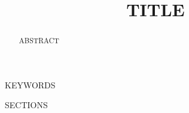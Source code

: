 \documentclass[conference]{IEEEtran}
\begin{document}
\title{{{TITLE}}}

\author{
}

\maketitle

\begin{abstract}
{{ABSTRACT}}
\end{abstract}

\begin{IEEEkeywords}
{{KEYWORDS}}
\end{IEEEkeywords}

{{SECTIONS}}



\end{document}

